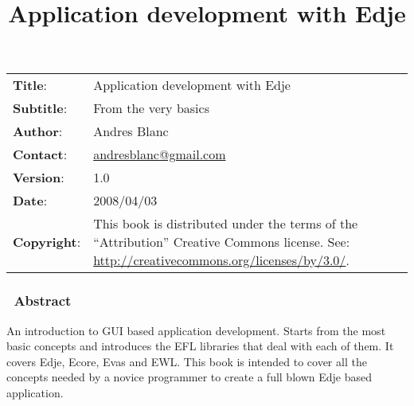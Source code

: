 \documentclass[12pt,a4paper,english]{book}
\title{Application development with Edje}
\author{}
\date{}
\newlength{\docinfowidth}
\newlength{\locallinewidth}
\begin{document}
\maketitle
\begin{center}
\begin{tabularx}{\docinfowidth}{lX}
\textbf{Title}: &
	Application development with Edje \\
\textbf{Subtitle}: &
	From the very basics \\
\textbf{Author}: &
	Andres Blanc \\
\textbf{Contact}: &
	\href{mailto:andresblanc@gmail.com}{andresblanc@gmail.com} \\
\textbf{Version}: &
	1.0 \\
\textbf{Date}: &
	2008/04/03 \\
\textbf{Copyright}: &
	This book is distributed under the terms of the ``Attribution''
Creative Commons license. See: \href{http://creativecommons.org/licenses/by/3.0/}{http://creativecommons.org/licenses/by/3.0/}. \\
\end{tabularx}
\end{center}

\setlength{\locallinewidth}{\linewidth}


\subsubsection*{~\hfill Abstract\hfill ~}

An introduction to GUI based application development. Starts from
the most basic concepts and introduces the EFL libraries that deal
with each of them. It covers Edje, Ecore, Evas and EWL. This book
is intended to cover all the concepts needed by a novice programmer
to create a full blown Edje based application.

\hypertarget{contents}{}
\renewcommand{\contentsname}{Contents}
\tableofcontents

\bigskip
\label{contents}



\hypertarget{book-overview}{}
\end{document}
